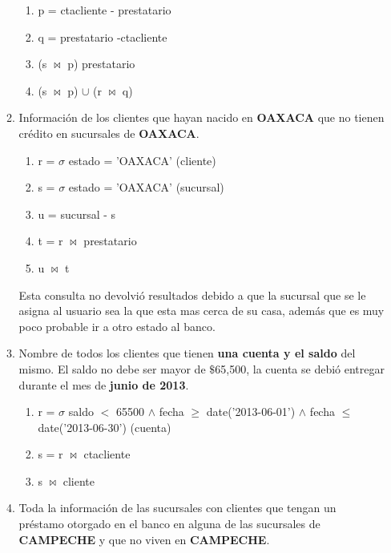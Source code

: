 \documentclass[10pt,letterpaper,fleqn]{article}
\begin{document}
\begin{enumerate}
\begin{enumerate}[a]
\begin{enumerate}[1]
                \item \textbar \quad p = ctacliente - prestatario
                \item \textbar \quad q = prestatario -ctacliente
                \item \textbar \quad (s $\bowtie$ p)  prestatario
                \item \textbar \quad (s $\bowtie$ p) $\cup$ (r $\bowtie$ q)
            \end{enumerate}
            \item Información de los clientes que hayan nacido en \textbf{OAXACA} que no tienen crédito en sucursales de \textbf{OAXACA}.
            \begin{enumerate}[1]
                \item \textbar \quad r = $\sigma$ estado = 'OAXACA' (cliente)
                \item \textbar \quad s = $\sigma$ estado = 'OAXACA' (sucursal)
                \item \textbar \quad u = sucursal - s
                \item \textbar \quad t = r $\bowtie$ prestatario
                \item \textbar \quad u $\bowtie$ t
            \end{enumerate}
            Esta consulta no devolvió resultados debido a que la sucursal que se le asigna al usuario sea la que esta mas cerca de su casa, además que es muy poco probable ir a otro estado al banco.
            \item Nombre de todos los clientes que tienen \textbf{una cuenta y el saldo} del mismo. El saldo no debe ser mayor de $\$$65,500, la cuenta se debió entregar durante el mes de \textbf{junio de 2013}.
            \begin{enumerate}[1]
                \item \textbar \quad r = $\sigma$ saldo $<$ 65500 $\wedge$ fecha $\geq$ date('2013-06-01') $\wedge$ fecha $\leq$ date('2013-06-30') (cuenta)
                \item \textbar \quad s = r $\bowtie$ ctacliente
                \item \textbar \quad s $\bowtie$ cliente
            \end{enumerate}
            \item Toda la información de las sucursales con clientes que tengan un préstamo otorgado en el banco en alguna de las sucursales de \textbf{CAMPECHE} y que no viven en \textbf{CAMPECHE}.

\end{enumerate}
\end{enumerate}
\end{document}
